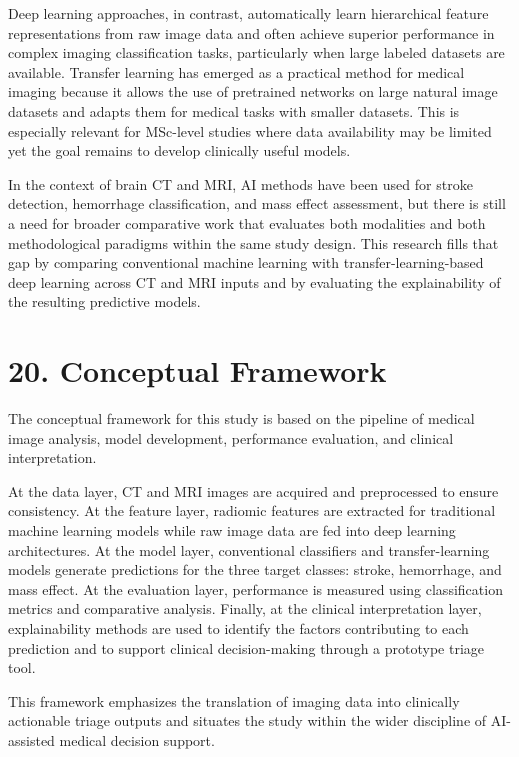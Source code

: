 \documentclass[12pt,a4paper]{report}
\begin{document}
Deep learning approaches, in contrast, automatically learn hierarchical feature representations from raw image data and often achieve superior performance in complex imaging classification tasks, particularly when large labeled datasets are available. Transfer learning has emerged as a practical method for medical imaging because it allows the use of pretrained networks on large natural image datasets and adapts them for medical tasks with smaller datasets. This is especially relevant for MSc-level studies where data availability may be limited yet the goal remains to develop clinically useful models.

In the context of brain CT and MRI, AI methods have been used for stroke detection, hemorrhage classification, and mass effect assessment, but there is still a need for broader comparative work that evaluates both modalities and both methodological paradigms within the same study design. This research fills that gap by comparing conventional machine learning with transfer-learning-based deep learning across CT and MRI inputs and by evaluating the explainability of the resulting predictive models.


\section{20. Conceptual Framework}

The conceptual framework for this study is based on the pipeline of medical image analysis, model development, performance evaluation, and clinical interpretation.

At the data layer, CT and MRI images are acquired and preprocessed to ensure consistency. At the feature layer, radiomic features are extracted for traditional machine learning models while raw image data are fed into deep learning architectures. At the model layer, conventional classifiers and transfer-learning models generate predictions for the three target classes: stroke, hemorrhage, and mass effect. At the evaluation layer, performance is measured using classification metrics and comparative analysis. Finally, at the clinical interpretation layer, explainability methods are used to identify the factors contributing to each prediction and to support clinical decision-making through a prototype triage tool.

This framework emphasizes the translation of imaging data into clinically actionable triage outputs and situates the study within the wider discipline of AI-assisted medical decision support.
\end{document}
